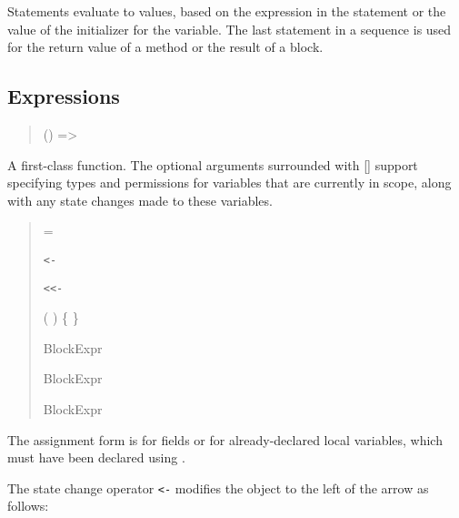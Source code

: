 Statements evaluate to values, based on the expression in the
statement or the value of the initializer for the variable.  The last
statement in a sequence is used for the return value of a method or
the result of a block.

\subsection{Expressions}

\begin{quote}



 {}   ()
              => 

 {}

\end{quote}

A first-class function.  The optional arguments surrounded with
  [] support specifying types and permissions for variables that are
  currently in scope, along with any state changes made to these
  variables.

\begin{quote}


 {}  = 

 {} \texttt{<- }

 {} \texttt{<{}<-} 

 {} (  ) \{  \}

 {}   BlockExpr

 {}   BlockExpr

 {} BlockExpr

 {}

\end{quote}

The assignment form is for fields or for already-declared local
variables, which must have been declared using . 

The state change operator \texttt{<-} modifies the object to the left of the
arrow as follows:

